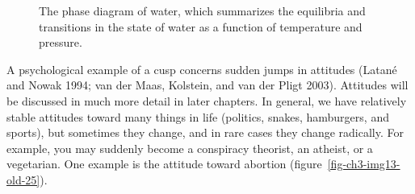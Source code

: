 \documentclass[
  a4paper,
  DIV=11,
  numbers=noendperiod,
  oneside]{scrreprt}
\begin{document}
\begin{figure}


\caption{\label{fig-ch3-img12-old-24}The phase diagram of water, which
summarizes the equilibria and transitions in the state of water as a
function of temperature and pressure.}

\end{figure}%

A psychological example of a cusp concerns sudden jumps in attitudes
(Latané and Nowak 1994; van der Maas, Kolstein, and van der Pligt 2003).
Attitudes will be discussed in much more detail in later chapters. In
general, we have relatively stable attitudes toward many things in life
(politics, snakes, hamburgers, and sports), but sometimes they change,
and in rare cases they change radically. For example, you may suddenly
become a conspiracy theorist, an atheist, or a vegetarian. One example
is the attitude toward abortion (figure~\ref{fig-ch3-img13-old-25}).
\end{document}
